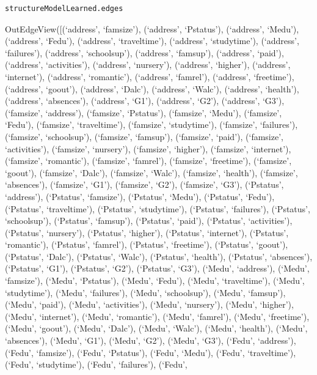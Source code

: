 \documentclass[
]{article}
\begin{document}
\begin{verbatim}
structureModelLearned.edges
\end{verbatim}

OutEdgeView({[}(`address', `famsize'), (`address', `Pstatus'),
(`address', `Medu'), (`address', `Fedu'), (`address', `traveltime'),
(`address', `studytime'), (`address', `failures'), (`address',
`schoolsup'), (`address', `famsup'), (`address', `paid'), (`address',
`activities'), (`address', `nursery'), (`address', `higher'),
(`address', `internet'), (`address', `romantic'), (`address', `famrel'),
(`address', `freetime'), (`address', `goout'), (`address', `Dalc'),
(`address', `Walc'), (`address', `health'), (`address', `absences'),
(`address', `G1'), (`address', `G2'), (`address', `G3'), (`famsize',
`address'), (`famsize', `Pstatus'), (`famsize', `Medu'), (`famsize',
`Fedu'), (`famsize', `traveltime'), (`famsize', `studytime'),
(`famsize', `failures'), (`famsize', `schoolsup'), (`famsize',
`famsup'), (`famsize', `paid'), (`famsize', `activities'), (`famsize',
`nursery'), (`famsize', `higher'), (`famsize', `internet'), (`famsize',
`romantic'), (`famsize', `famrel'), (`famsize', `freetime'), (`famsize',
`goout'), (`famsize', `Dalc'), (`famsize', `Walc'), (`famsize',
`health'), (`famsize', `absences'), (`famsize', `G1'), (`famsize',
`G2'), (`famsize', `G3'), (`Pstatus', `address'), (`Pstatus',
`famsize'), (`Pstatus', `Medu'), (`Pstatus', `Fedu'), (`Pstatus',
`traveltime'), (`Pstatus', `studytime'), (`Pstatus', `failures'),
(`Pstatus', `schoolsup'), (`Pstatus', `famsup'), (`Pstatus', `paid'),
(`Pstatus', `activities'), (`Pstatus', `nursery'), (`Pstatus',
`higher'), (`Pstatus', `internet'), (`Pstatus', `romantic'), (`Pstatus',
`famrel'), (`Pstatus', `freetime'), (`Pstatus', `goout'), (`Pstatus',
`Dalc'), (`Pstatus', `Walc'), (`Pstatus', `health'), (`Pstatus',
`absences'), (`Pstatus', `G1'), (`Pstatus', `G2'), (`Pstatus', `G3'),
(`Medu', `address'), (`Medu', `famsize'), (`Medu', `Pstatus'), (`Medu',
`Fedu'), (`Medu', `traveltime'), (`Medu', `studytime'), (`Medu',
`failures'), (`Medu', `schoolsup'), (`Medu', `famsup'), (`Medu',
`paid'), (`Medu', `activities'), (`Medu', `nursery'), (`Medu',
`higher'), (`Medu', `internet'), (`Medu', `romantic'), (`Medu',
`famrel'), (`Medu', `freetime'), (`Medu', `goout'), (`Medu', `Dalc'),
(`Medu', `Walc'), (`Medu', `health'), (`Medu', `absences'), (`Medu',
`G1'), (`Medu', `G2'), (`Medu', `G3'), (`Fedu', `address'), (`Fedu',
`famsize'), (`Fedu', `Pstatus'), (`Fedu', `Medu'), (`Fedu',
`traveltime'), (`Fedu', `studytime'), (`Fedu', `failures'), (`Fedu',
\end{document}
